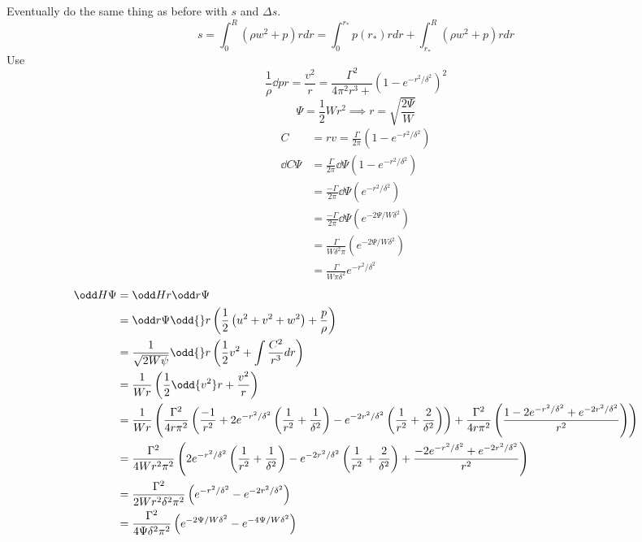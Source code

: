 \documentclass{X:/Documents/Coding/Latex/myreport}
\begin{document}
Eventually do the same thing as before with $s$ and $\Delta s$.
\[s = \int_0^R \left(\rho w^2 + p\right) rdr = \int_0^{r_*} p(r_*) rdr + \int_{r_*}^R \left(\rho w^2 + p\right) rdr\]
Use
\[\frac1\rho \dd p r = \frac{v^2}{r} = \frac{\Gamma^2}{4\pi^2r^3+}\left(1-e^{-r^2/\delta^2}\right)^2\]
\[\Psi = \frac12 W r^2 \implies r = \sqrt{\frac{2\Psi}{W}}\]
\begin{align*}
    C &= rv = \frac{\Gamma}{2\pi} \left(1-e^{-r^2/\delta^2}\right)\\
    \dd C\Psi &=\frac{\Gamma}{2\pi} \dd{}\Psi \left(1-e^{-r^2/\delta^2}\right)\\
    &=\frac{-\Gamma}{2\pi} \dd{}\Psi \left(e^{-r^2/\delta^2}\right)\\
    &=\frac{-\Gamma}{2\pi} \dd{}\Psi \left(e^{-2\Psi/W\delta^2}\right)\\
    &=\frac{\Gamma}{W\delta^2\pi} \left(e^{-2\Psi/W\delta^2}\right)\\
    &=\frac{\Gamma}{W\pi\delta^2} e^{-r^2/\delta^2}
\end{align*}
\begin{align*}
    \odd H\Psi &= \odd H r \odd r\Psi \\
    &=\odd r\Psi \odd{}r\left(\frac12 \left(u^2+v^2 + w^2\right) + \frac{p}{\rho}\right)\\
    &=\frac{1}{\sqrt{2W\psi}} \odd{}r\left(\frac12 v^2 + \int\frac{C^2}{r^3}dr \right)\\
    &=\frac{1}{Wr} \left(\frac12 \odd{v^2}r + \frac{v^2}{r} \right)\\
    &=\frac{1}{Wr} \left(\frac{\Gamma^2}{4r\pi^2} \left(\frac{-1}{r^2} +2e^{-r^2/\delta^2}\left(\frac{1}{r^2} + \frac{1}{\delta^2}\right) -e^{-2r^2/\delta^2} \left(\frac{1}{r^2} + \frac{2}{ \delta^2}\right)\right) +  \frac{\Gamma^2}{4r\pi^2}\left(\frac{1 - 2e^{-r^2/\delta^2} + e^{-2r^2/\delta^2}}{r^2}\right) \right)\\
    &=\frac{\Gamma^2}{4Wr^2 \pi^2} \left(2e^{-r^2/\delta^2}\left(\frac{1}{r^2} + \frac{1}{\delta^2}\right) -e^{-2r^2/\delta^2} \left(\frac{1}{r^2} + \frac{2}{ \delta^2}\right) +\frac{ - 2e^{-r^2/\delta^2} + e^{-2r^2/\delta^2}}{r^2}\right)\\
    &= \frac{\Gamma^2}{2Wr^2\delta^2\pi^2} \left(e^{-r^2/\delta^2} - e^{-2r^2/\delta^2}\right)\\
    &= \frac{\Gamma^2}{4\Psi\delta^2\pi^2} \left(e^{-2\Psi/W\delta^2} - e^{-4\Psi/W\delta^2}\right)\\
\end{align*}
\end{document}
